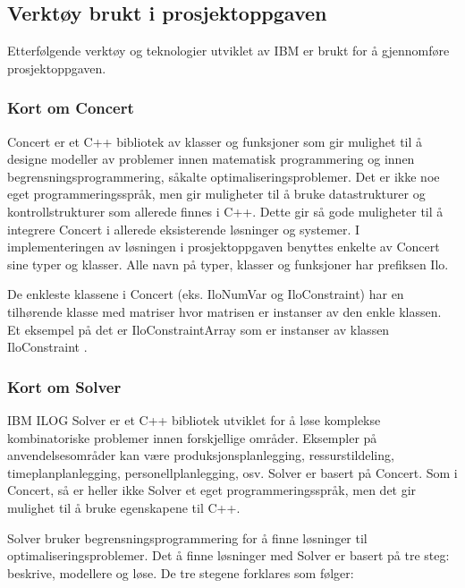 \subsection{Verktøy brukt i prosjektoppgaven}
Etterfølgende verktøy og teknologier utviklet av IBM er brukt for å gjennomføre prosjektoppgaven.

\subsubsection{Kort om Concert}
Concert er et C++ bibliotek av klasser og funksjoner som gir mulighet til å designe modeller av problemer innen matematisk programmering og innen begrensningsprogrammering, såkalte optimaliseringsproblemer. Det er ikke noe eget programmeringsspråk, men gir muligheter til å bruke datastrukturer og kontrollstrukturer som allerede finnes i C++. Dette gir så gode muligheter til å integrere Concert i allerede eksisterende løsninger og systemer. I implementeringen av løsningen i prosjektoppgaven benyttes enkelte av Concert sine typer og klasser. Alle navn på typer, klasser og funksjoner har prefiksen Ilo.

De enkleste klassene i Concert (eks. IloNumVar og IloConstraint) har en tilhørende klasse med matriser hvor matrisen er instanser av den enkle klassen. Et eksempel på det er IloConstraintArray som er instanser av klassen IloConstraint
\cite{cpconcertilog}.

\subsubsection{Kort om Solver}
IBM ILOG Solver er et C++ bibliotek utviklet for å løse komplekse kombinatoriske problemer innen forskjellige områder. Eksempler på anvendelsesområder kan være produksjonsplanlegging, ressurstildeling, timeplanplanlegging, personellplanlegging, osv. Solver er basert på Concert. Som i Concert, så er heller ikke Solver et eget programmeringsspråk, men det gir mulighet til å bruke egenskapene til C++.

Solver bruker begrensningsprogrammering for å finne løsninger til optimaliseringsproblemer. Det å finne løsninger med Solver er basert på tre steg: beskrive, modellere og løse. De tre stegene forklares som følger:

